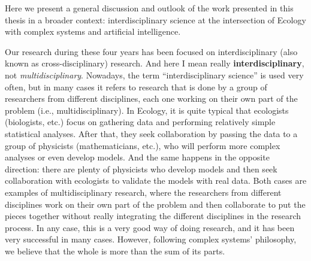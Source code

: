 
Here we present a general discussion and outlook of the work presented in this
thesis in a broader context: interdisciplinary science at the intersection of
Ecology with complex systems and artificial intelligence.


Our research during these four years has been focused on interdisciplinary
(also known as cross-disciplinary) research. And here I mean really
\textbf{interdisciplinary}, not \textit{multidisciplinary}. Nowadays, the term
``interdisciplinary science'' is used very often, but in many cases it refers
to research that is done by a group of researchers from different disciplines,
each one working on their own part of the problem (i.e., multidisciplinary). In
Ecology, it is quite typical that ecologists (biologists, etc.) focus on
gathering data and performing relatively simple statistical analyses. After
that, they seek collaboration by passing the data to a group of physicists
(mathematicians, etc.), who will perform more complex analyses or even develop
models. And the same happens in the opposite direction: there are plenty of
physicists who develop models and then seek collaboration with ecologists to
validate the models with real data. Both cases are examples of
multidisciplinary research, where the researchers from different disciplines
work on their own part of the problem and then collaborate to put the pieces
together without really integrating the different disciplines in the research
process. In any case, this is a very good way of doing research, and it has
been very successful in many cases. However, following complex systems'
philosophy, we believe that the whole is more than the sum of its parts.


